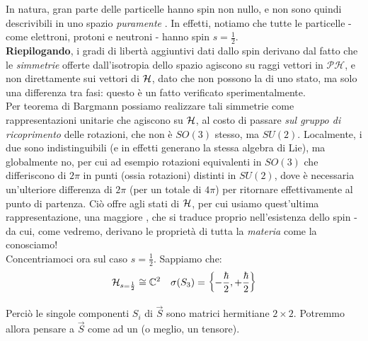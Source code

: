 \documentclass[../../FisicaTeorica.tex]{subfiles}
\begin{document}
In natura, gran parte delle particelle hanno spin non nullo, e non sono quindi descrivibili in uno spazio \textit{puramente} . In effetti, notiamo che tutte le particelle  - come elettroni, protoni e neutroni - hanno spin $s=\frac{1}{2}$.\\

\textbf{Riepilogando}, i gradi di libertà aggiuntivi dati dallo spin derivano dal fatto che le \textit{simmetrie} offerte dall'isotropia dello spazio agiscono su raggi vettori in $\mathcal{PH}$, e non direttamente sui vettori di $\mathcal{H}$, dato che non possono  la  di uno stato, ma solo una differenza tra fasi: questo è un fatto verificato sperimentalmente.\\
Per teorema di Bargmann possiamo realizzare tali simmetrie come rappresentazioni unitarie che agiscono su $\mathcal{H}$, al costo di passare \textit{sul gruppo di ricoprimento} delle rotazioni, che non è $SO(3)$ stesso, ma $SU(2)$. Localmente, i due sono indistinguibili (e in effetti generano la stessa algebra di Lie), ma globalmente no, per cui ad esempio rotazioni equivalenti in $SO(3)$ che differiscono di $2\pi$  in punti (ossia rotazioni) distinti in $SU(2)$, dove è necessaria un'ulteriore differenza di $2\pi$ (per un totale di $4\pi$) per ritornare effettivamente al punto di partenza. Ciò offre agli stati di $\mathcal{H}$, per cui usiamo quest'ultima rappresentazione, una maggiore , che si traduce proprio nell'esistenza dello spin - da cui, come vedremo, derivano le proprietà di tutta la \textit{materia} come la conosciamo!\\

Concentriamoci ora sul caso $s=\frac{1}{2}$. Sappiamo che:
\begin{align*}
\mathcal{H}_{s=\frac{1}{2}}\cong \mathbb{C}^2 && \sigma(S_3) = \left\{-\frac{\hbar}{2}, +\frac{\hbar}{2} \right\}
\end{align*}

Perciò le singole componenti $S_i$ di $\vec{S}$ sono matrici hermitiane $2\times 2$. Potremmo allora pensare a $\vec{S}$ come ad un  (o meglio, un tensore).\\
\end{document}
